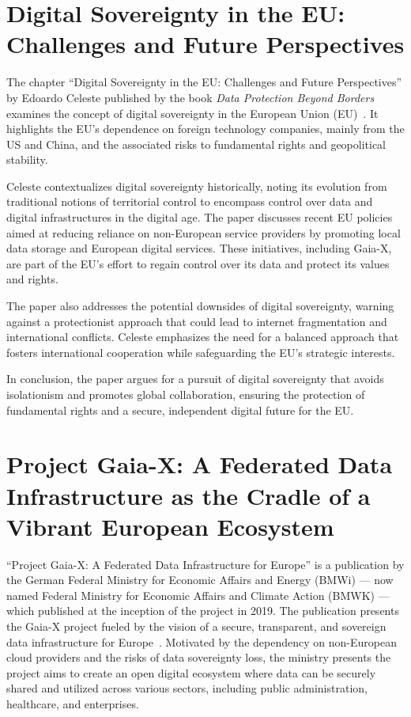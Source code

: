 \section{Digital Sovereignty in the EU: Challenges and Future Perspectives}\label{sec:digital-sovereignty-in-the-eu:-challenges-and-future-perspectives}

The chapter ``Digital Sovereignty in the EU: Challenges and Future Perspectives'' by Edoardo Celeste published by the book \textit{Data Protection Beyond Borders} examines the concept of digital sovereignty in the European Union (EU)~\cite{dig_sovereignty_challenges}.
It highlights the EU's dependence on foreign technology companies, mainly from the US and China, and the associated risks to fundamental rights and geopolitical stability.

Celeste contextualizes digital sovereignty historically, noting its evolution from traditional notions of territorial control to encompass control over data and digital infrastructures in the digital age.
The paper discusses recent EU policies aimed at reducing reliance on non-European service providers by promoting local data storage and European digital services.
These initiatives, including Gaia-X, are part of the EU's effort to regain control over its data and protect its values and rights.

The paper also addresses the potential downsides of digital sovereignty, warning against a protectionist approach that could lead to internet fragmentation and international conflicts.
Celeste emphasizes the need for a balanced approach that fosters international cooperation while safeguarding the EU's strategic interests.

In conclusion, the paper argues for a pursuit of digital sovereignty that avoids isolationism and promotes global collaboration, ensuring the protection of fundamental rights and a secure, independent digital future for the EU.

\section{Project Gaia-X: A Federated Data Infrastructure as the Cradle of a Vibrant European Ecosystem}\label{sec:project-gaia-x:-a-federated-data-infrastructure-as-the-cradle-of-a-vibrant-european-ecosystem}

``Project Gaia-X: A Federated Data Infrastructure for Europe'' is a publication by the German Federal Ministry for Economic Affairs and Energy (BMWi) --- now named Federal Ministry for Economic Affairs and Climate Action (BMWK) --- which published at the inception of the project in 2019.
The publication presents the Gaia-X project fueled by the vision of a secure, transparent, and sovereign data infrastructure for Europe~\cite{project_gaia_x}.
Motivated by the dependency on non-European cloud providers and the risks of data sovereignty loss, the ministry presents the project aims to create an open digital ecosystem where data can be securely shared and utilized across various sectors, including public administration, healthcare, and enterprises.

